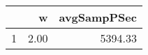 \begin{table}[h]
\centering
\begingroup\tiny
\begin{tabular}{rrr}
  \hline
 & w & avgSampPSec \\ 
  \hline
1 & 2.00 & 5394.33 \\ 
   \hline
\end{tabular}
\endgroup
\end{table}
